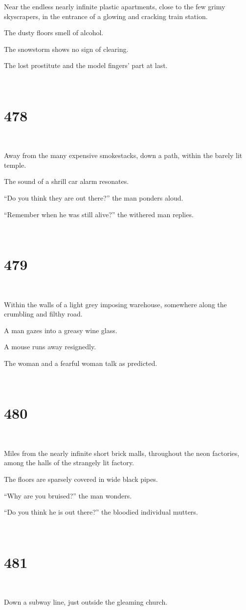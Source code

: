 \documentclass{report}
\begin{document}
Near the endless nearly infinite plastic apartments, close to the few grimy skyscrapers, in the entrance of a glowing and cracking train station.

The dusty floors smell of alcohol.

The snowstorm shows no sign of clearing.

The lost prostitute and the model fingers' part at last.

~
\chapter*{478}
~

Away from the many expensive smokestacks, down a path, within the barely lit temple.

The sound of a shrill car alarm resonates.

``Do you think they are out there?'' the man ponders aloud.

``Remember when he was still alive?'' the withered man replies.

~
\chapter*{479}
~

Within the walls of a light grey imposing warehouse, somewhere along the crumbling and filthy road.

A man gazes into a greasy wine glass.

A mouse runs away resignedly.

The woman and a fearful woman talk as predicted.

~
\chapter*{480}
~

Miles from the nearly infinite short brick malls, throughout the neon factories, among the halls of the strangely lit factory.

The floors are sparsely covered in wide black pipes.

``Why are you bruised?'' the man wonders.

``Do you think he is out there?'' the bloodied individual mutters.

~
\chapter*{481}
~

Down a subway line, just outside the gleaming church.
\end{document}
